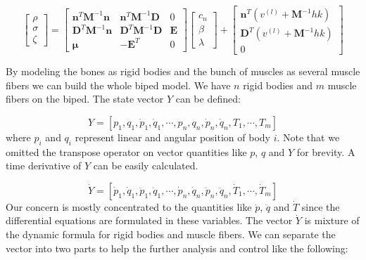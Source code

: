\documentclass[a4paper,10pt]{article}
\begin{document}
\begin{equation}
\left[ \begin{array}{c}
\rho \\
\sigma \\
\zeta
\end{array}  \right]
=
\left[ \begin{array}{ccc}
\mathbf{n}^T \mathbf{M}^{-1} \mathbf{n}  &   \mathbf{n}^T \mathbf{M}^{-1} \mathbf{D}  & 0          \\
\mathbf{D}^T \mathbf{M}^{-1} \mathbf{n}  &   \mathbf{D}^T \mathbf{M}^{-1} \mathbf{D}  & \mathbf{E} \\
\boldsymbol{\mu}                         &   -\mathbf{E}^T & 0
\end{array}  \right]
\left[ \begin{array}{c}
c_n \\
\beta \\
\lambda
\end{array}  \right]
+
\left[ \begin{array}{c}
\mathbf{n}^T ( v^{(l)} + \mathbf{M}^{-1} hk ) \\
\mathbf{D}^T ( v^{(l)} + \mathbf{M}^{-1} hk ) \\
0
\end{array}  \right]
\end{equation}




By modeling the bones as rigid bodies and the bunch of muscles as several muscle
fibers we can build the whole biped model. We have $n$ rigid bodies and
$m$ muscle fibers on the biped. The state vector $Y$ can be defined:

\begin{equation}
Y = [ p_1, q_1, \dot{p}_1, \dot{q}_1, \cdots ,
      p_n, q_n, \dot{p}_n, \dot{q}_n,
      T_1, \cdots, T_m]
\end{equation}
where $p_i$ and $q_i$ represent linear and angular position of body $i$.
Note that we omitted the transpose operator on vector quantities like $p$,
$q$ and $Y$ for brevity. A time derivative of $Y$ can be easily
calculated.

\begin{equation}
\dot{Y} = [ \dot{p}_1, \dot{q}_1, \ddot{p}_1, \ddot{q}_1, \cdots ,
            \dot{p}_n, \dot{q}_n, \ddot{p}_n, \ddot{q}_n,
            \dot{T}_1, \cdots, \dot{T}_m]
\end{equation}
Our concern is mostly concentrated to the quantities like $\ddot{p}$,
$\ddot{q}$ and $\dot{T}$ since the differential equations are formulated
in these variables. The vector $\dot{Y}$ is mixture
of the dynamic formula for rigid bodies and muscle fibers. We can separate
the vector into two parts to help the further analysis and control like the
following:
\end{document}
